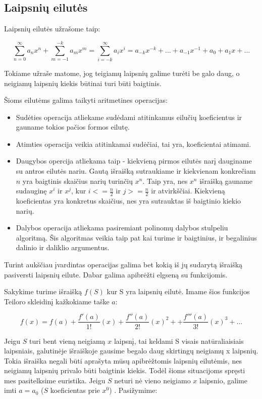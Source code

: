 	
\subsection{Laipsnių eilutės}
	
	Laipsnių eilutės užrašome taip:
	
	\[\sum_{n=0}^{\infty} a_nx^n + \sum_{m=-1}^{-k} a_mx^m = \sum_{i=-k}^{\infty} a_ix^i  = a_{-k} x^{-k} + ... + a_{-1} x^{-1} + a_0 + a_1 x + ... \]
	
	Tokiame užraše matome, jog teigiamų laipsnių galime turėti be galo daug, o neigiamų laipsnių kiekis būtinai turi būti baigtinis.
	
	Šioms eilutėms galima taikyti aritmetines operacijas:
	
	\begin{itemize}
		\item Sudėties operacija atliekame sudėdami atitinkamus eilučių koeficientus ir gauname tokios pačios formos eilutę.
		\item Atimties operacija veikia atitinkamai sudėčiai, tai yra, koeficientai atimami.
		\item Daugybos opercija atliekama taip - kiekvieną pirmos eilutės narį dauginame su antros eilutės nariu.
			  Gautą išraišką sutraukiame ir kiekvienam konkrečiam $n$ yra baigtinis skaičius narių turinčių $x^n$.
			  Taip yra, nes $x^n$ išraišką gauname sudauginę $x^i$ ir $x^j$, kur $i <= \frac{n}{2}$ ir $j >= \frac{n}{2}$ ir atvirkščiai.
			  Kiekvieną koeficientas yra konkretus skaičius, nes yra sutrauktas iš baigtinio kiekio narių.
		\item Dalybos operacija atliekama pasiremiant polinomų dalybos stulpeliu algoritmą. 
			  Šis algoritmas veikia taip pat kai turime ir baigtinius, ir begalinius dalinio ir daliklio argumentus.
	\end{itemize}
	
	Turint aukščiau įvardintas operacijas galima bet kokią iš jų sudarytą išraišką pasiversti laipsnių eilute.
	Dabar galima apibrėžti elgseną su funkcijomis.
	
	Sakykime turime išraišką $f(S)$ kur S yra laipsnių eilutė. 
	Imame šios funkcijos Teiloro skleidinį kažkokiame taške $a$: 
	
	\[f(x) = f(a) + \frac{f'(a)}{1!}(x)+\frac{f''(a)}{2!}(x)^2 + +\frac{f'''(a)}{3!}(x)^3 + ...\]
	
	Jeigu $S$ turi bent vieną neigiamą $x$ laipsnį, tai keldami S visais natūraliaisiais laipsniais, galutinėje išraiškoje gausime begalo daug skirtingų neigiamų x laipsnių.
	Tokia išraiška negali būti aprašyta mūsų apibrėžtomis laipsnių eilutėmis, nes neigiamų laipsnių privalo būti baigtinis kiekis. 
	Todėl šioms situacijoms spręsti mes pasitelksime euristika.
	Jeigu $S$ neturi nė vieno neigiamo $x$ laipsnio, galime imti $a = a_0$ ($S$ koeficientas prie $x^0$) .
	Pasižymime:
	
